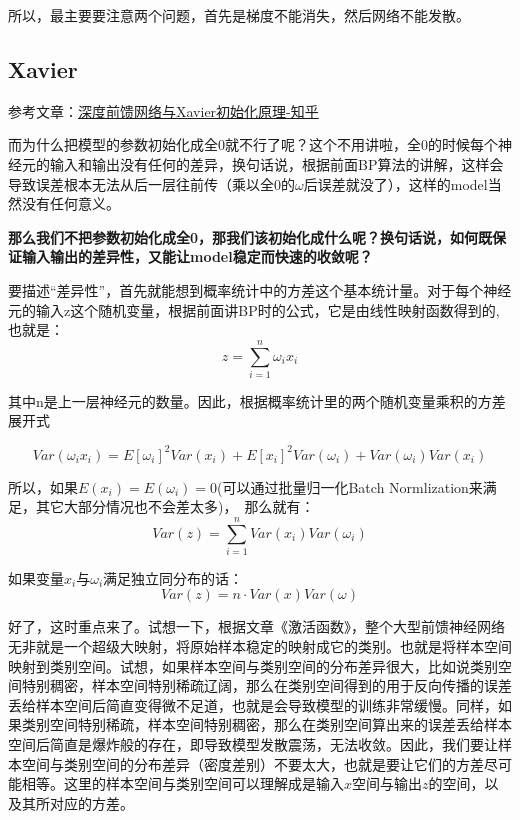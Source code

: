 所以，最主要要注意两个问题，首先是梯度不能消失，然后网络不能发散。

\subsection{Xavier}

参考文章：\href{https://zhuanlan.zhihu.com/p/27919794}{深度前馈网络与Xavier初始化原理-知乎}

而为什么把模型的参数初始化成全0就不行了呢？这个不用讲啦，全0的时候每个神经元的输入和输出没有任何的差异，换句话说，根据前面BP算法的讲解，这样会导致误差根本无法从后一层往前传（乘以全0的$\omega$后误差就没了），这样的model当然没有任何意义。

{\bfseries 那么我们不把参数初始化成全0，那我们该初始化成什么呢？换句话说，如何既保证输入输出的差异性，又能让model稳定而快速的收敛呢？}

要描述“差异性”，首先就能想到概率统计中的方差这个基本统计量。对于每个神经元的输入z这个随机变量，根据前面讲BP时的公式，它是由线性映射函数得到的,也就是：
\begin{displaymath}
z = \sum_{i = 1}^{n}\omega_i x_i
\end{displaymath}

其中n是上一层神经元的数量。因此，根据概率统计里的两个随机变量乘积的方差展开式

\begin{displaymath}
Var(\omega_i x_i) = E[\omega_i]^2 Var(x_i) + E[x_i]^2Var(\omega_i) + Var(\omega_i)Var(x_i)
\end{displaymath}

所以，如果$E(x_i) = E(\omega_i)=0$(可以通过批量归一化Batch Normlization来满足，其它大部分情况也不会差太多)，　那么就有：
\begin{displaymath}
Var(z) = \sum_{i = 1}^{n}Var(x_i)Var(\omega_i)
\end{displaymath}

如果变量$x_i$与$\omega_i$满足独立同分布的话：
\begin{displaymath}
Var(z) = n \cdot Var(x)Var(\omega)
\end{displaymath}

好了，这时重点来了。试想一下，根据文章《激活函数》，整个大型前馈神经网络无非就是一个超级大映射，将原始样本稳定的映射成它的类别。也就是将样本空间映射到类别空间。试想，如果样本空间与类别空间的分布差异很大，比如说类别空间特别稠密，样本空间特别稀疏辽阔，那么在类别空间得到的用于反向传播的误差丢给样本空间后简直变得微不足道，也就是会导致模型的训练非常缓慢。同样，如果类别空间特别稀疏，样本空间特别稠密，那么在类别空间算出来的误差丢给样本空间后简直是爆炸般的存在，即导致模型发散震荡，无法收敛。因此，我们要让样本空间与类别空间的分布差异（密度差别）不要太大，也就是要让它们的方差尽可能相等。这里的样本空间与类别空间可以理解成是输入$x$空间与输出$z$的空间，以及其所对应的方差。

